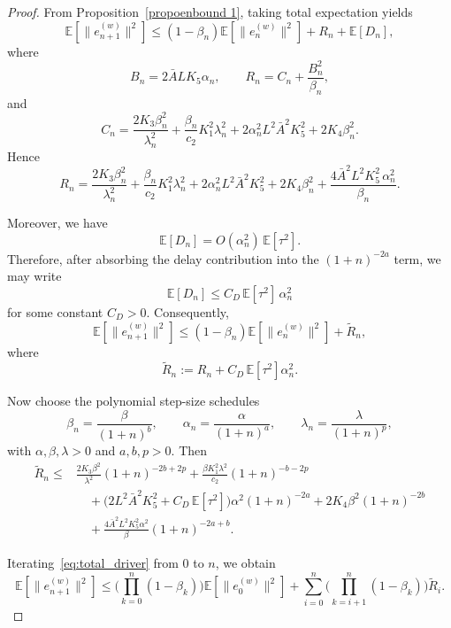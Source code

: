\documentclass{article}
\begin{document}
\begin{proof}
From Proposition~\ref{propoenbound 1}, taking total expectation yields
\begin{equation}
\label{eq:total_exp_recap}
\mathbb{E}\!\left[\|e_{n+1}^{(w)}\|^2\right]
\le
(1-\beta_n)\mathbb{E}\!\left[\|e_n^{(w)}\|^2\right]
+ R_n + \mathbb{E}[D_n],
\end{equation}
where
\[
B_n = 2\bar A L K_5 \alpha_n,
\qquad
R_n = C_n + \frac{B_n^2}{\beta_n},
\]
and
\[
C_n
=
\frac{2K_3\beta_n^2}{\lambda_n^2}
+
\frac{\beta_n}{c_2}K_1^2\lambda_n^2
+
2\alpha_n^2 L^2 \bar{A}^2 K_5^2
+
2K_4\beta_n^2.
\]
Hence
\[
R_n
=
\frac{2K_3\beta_n^2}{\lambda_n^2}
+
\frac{\beta_n}{c_2}K_1^2\lambda_n^2
+
2\alpha_n^2 L^2 \bar{A}^2 K_5^2
+
2K_4\beta_n^2
+
\frac{4\bar A^2 L^2 K_5^2\,\alpha_n^2}{\beta_n}.
\]

Moreover, we have
\begin{equation}
\mathbb{E}[D_n]
=
O(\alpha_n^2)\,\mathbb{E}[\tau^2].
\label{Delaynew assumption}
\end{equation}
Therefore, after absorbing the delay contribution into the \((1+n)^{-2a}\) term, we may write
\[
\mathbb{E}[D_n]
\le
C_D \,\mathbb{E}[\tau^2]\,\alpha_n^2
\]
for some constant \(C_D>0\). Consequently,
\begin{equation}
\label{eq:total_driver}
\mathbb{E}\!\left[\|e_{n+1}^{(w)}\|^2\right]
\le
(1-\beta_n)\mathbb{E}\!\left[\|e_n^{(w)}\|^2\right]
+
\widetilde R_n,
\end{equation}
where
\[
\widetilde R_n
:=
R_n + C_D\,\mathbb{E}[\tau^2]\alpha_n^2.
\]

Now choose the polynomial step-size schedules
\[
\beta_n=\frac{\beta}{(1+n)^b},
\qquad
\alpha_n=\frac{\alpha}{(1+n)^a},
\qquad
\lambda_n=\frac{\lambda}{(1+n)^p},
\]
with \(\alpha,\beta,\lambda>0\) and \(a,b,p>0\). Then
\begin{equation}
\label{Rn-final}
\begin{aligned}
\widetilde R_n
\le{}&
\frac{2K_3\beta^2}{\lambda^2}(1+n)^{-2b+2p}
+
\frac{\beta K_1^2\lambda^2}{c_2}(1+n)^{-b-2p}
\\
&\quad
+
\Big(2L^2\bar A^2K_5^2
+
C_D\,\mathbb{E}[\tau^2]\Big)\alpha^2(1+n)^{-2a}
+
2K_4\beta^2(1+n)^{-2b}
\\
&\quad
+
\frac{4\bar A^2 L^2 K_5^2\alpha^2}{\beta}(1+n)^{-2a+b}.
\end{aligned}
\end{equation}

Iterating~\eqref{eq:total_driver} from \(0\) to \(n\), we obtain
\begin{equation}
\label{eq:iterated_exact}
\mathbb{E}\!\left[\|e_{n+1}^{(w)}\|^2\right]
\le
\Bigg(\prod_{k=0}^{n}(1-\beta_k)\Bigg)\mathbb{E}\!\left[\|e_0^{(w)}\|^2\right]
+
\sum_{i=0}^{n}
\Bigg(\prod_{k=i+1}^{n}(1-\beta_k)\Bigg)\widetilde R_i.
\end{equation}


\end{proof}
\end{document}
